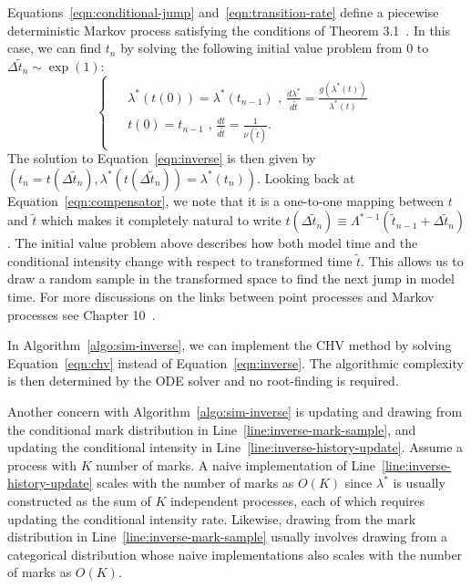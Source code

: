 \documentclass{juliacon}
\numberwithin{equation}{section}
\begin{document}
Equations~\ref{eqn:conditional-jump} and~\ref{eqn:transition-rate} define a piecewise deterministic Markov process satisfying the conditions of Theorem 3.1~\cite{veltz2015}. In this case, we can find \( t_n \) by solving the following initial value problem from \( 0 \) to \( \Delta \tilde{t}_n \sim \exp(1) \):
\begin{equation} \label{eqn:chv}
  \begin{cases}
  \begin{aligned}
    & \lambda^\ast (t(0)) = \lambda^\ast (t_{n-1}) \text{ , } \frac{d \lambda^\ast}{d \tilde{t}} =  \frac{g(\lambda^\ast(t))}{\lambda^\ast (t)} \\
    & t (0) = t_{n-1} \text{ , } \frac{d t}{d \tilde{t} } = \frac{1}{\nu (\tilde{t})}.
  \end{aligned}
  \end{cases}
\end{equation}
The solution to Equation~\ref{eqn:inverse} is then given by \( ( t_n = t(\Delta \tilde{t}_n), \lambda^\ast(t(\Delta \tilde{t}_n)) =  \lambda^\ast(t_n)) \). Looking back at Equation~\ref{eqn:compensator}, we note that it is a one-to-one mapping between \( t \) and \( \tilde{t} \) which makes it completely natural to write \( t(\Delta \tilde{t}_n) \equiv \Lambda^{\ast-1} (\tilde{t}_{n-1} + \Delta \tilde{t}_n) \). The initial value problem above describes how both model time and the conditional intensity change with respect to transformed time \( \tilde{t} \). This allows us to draw a random sample in the transformed space to find the next jump in model time. For more discussions on the links between point processes and Markov processes see Chapter 10~\cite{daley2007}.

In Algorithm~\ref{algo:sim-inverse}, we can implement the CHV method by solving Equation~\ref{eqn:chv} instead of Equation~\ref{eqn:inverse}. The algorithmic complexity is then determined by the ODE solver and no root-finding is required.

Another concern with Algorithm~\ref{algo:sim-inverse} is updating and drawing from the conditional mark distribution in Line~\ref{line:inverse-mark-sample}, and updating the conditional intensity in Line~\ref{line:inverse-history-update}. Assume a process with \( K \) number of marks. A naive implementation of Line~\ref{line:inverse-history-update} scales with the number of marks as \( O(K) \) since \( \lambda^\ast \) is usually constructed as the sum of \( K \) independent processes, each of which requires updating the conditional intensity rate. Likewise, drawing from the mark distribution in Line~\ref{line:inverse-mark-sample} usually involves drawing from a categorical distribution whose naive implementations also scales with the number of marks as \( O(K) \).
\end{document}
